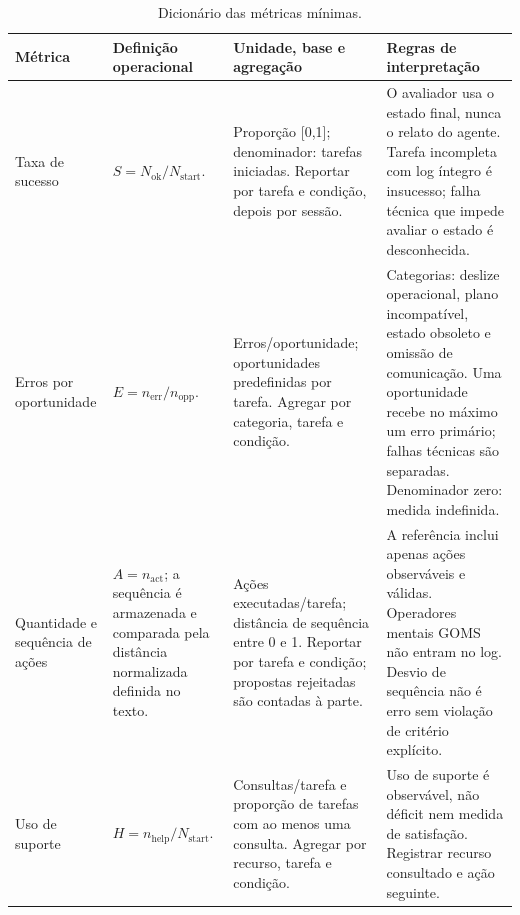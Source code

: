 \documentclass[conference]{IEEEtran}
\begin{document}
\begin{table}[!t]
\centering
\caption{Dicionário das métricas mínimas.}
\label{tab:metricas}
\scriptsize
\renewcommand{\arraystretch}{1.12}
\setlength{\tabcolsep}{4pt}
\begin{tabularx}{\textwidth}{@{}>{\RaggedRight\arraybackslash}p{1.9cm}>{\RaggedRight\arraybackslash}p{3.0cm}>{\RaggedRight\arraybackslash}p{3.3cm}Y@{}}
\toprule
\textbf{Métrica} & \textbf{Definição operacional} & \textbf{Unidade, base e agregação} & \textbf{Regras de interpretação} \\
\midrule
Taxa de sucesso & $S=N_{\mathrm{ok}}/N_{\mathrm{start}}$. & Proporção [0,1]; denominador: tarefas iniciadas. Reportar por tarefa e condição, depois por sessão. & O avaliador usa o estado final, nunca o relato do agente. Tarefa incompleta com log íntegro é insucesso; falha técnica que impede avaliar o estado é desconhecida. \\
Erros por oportunidade & $E=n_{\mathrm{err}}/n_{\mathrm{opp}}$. & Erros/oportunidade; oportunidades predefinidas por tarefa. Agregar por categoria, tarefa e condição. & Categorias: deslize operacional, plano incompatível, estado obsoleto e omissão de comunicação. Uma oportunidade recebe no máximo um erro primário; falhas técnicas são separadas. Denominador zero: medida indefinida. \\
Quantidade e sequência de ações & $A=n_{\mathrm{act}}$; a sequência é armazenada e comparada pela distância normalizada definida no texto. & Ações executadas/tarefa; distância de sequência entre 0 e 1. Reportar por tarefa e condição; propostas rejeitadas são contadas à parte. & A referência inclui apenas ações observáveis e válidas. Operadores mentais GOMS não entram no log. Desvio de sequência não é erro sem violação de critério explícito. \\
Uso de suporte & $H=n_{\mathrm{help}}/N_{\mathrm{start}}$. & Consultas/tarefa e proporção de tarefas com ao menos uma consulta. Agregar por recurso, tarefa e condição. & Uso de suporte é observável, não déficit nem medida de satisfação. Registrar recurso consultado e ação seguinte. \\
\bottomrule
\end{tabularx}
\end{table}
\end{document}
